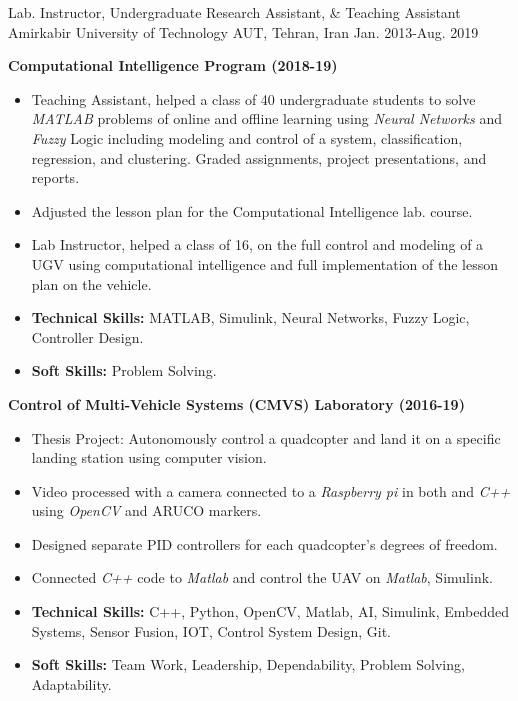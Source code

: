 \begin{cventries}
\cventry
{Lab. Instructor, Undergraduate Research Assistant, \& Teaching Assistant}
{Amirkabir University of Technology}
{AUT, Tehran, Iran}
{Jan. 2013-Aug. 2019}
{
    \begin{cvitems}
    \item{\textbf{Computational Intelligence Program (2018-19)}}
      \begin{itemize}[label= - ] %
        \item{Teaching Assistant, helped a class of 40 undergraduate students to solve \textit{MATLAB} problems of online and offline learning using \textit{Neural Networks} and \textit{Fuzzy} Logic including modeling and control of a system, classification, regression, and clustering. Graded assignments, project presentations, and reports.}
        \item{Adjusted the lesson plan for the Computational Intelligence lab. course.}
        \item{Lab Instructor, helped a class of 16, on the full control and modeling of a UGV using computational intelligence and full implementation of the lesson plan on the vehicle.}
        \item {\textbf{Technical Skills:} MATLAB, Simulink, Neural Networks, Fuzzy Logic, Controller Design.}
        \item {\textbf{Soft Skills:} Problem Solving.}
      \end{itemize}
      \item{\textbf{Control of Multi-Vehicle Systems (CMVS) Laboratory (2016-19)}}
      \begin{itemize}[label= - ] %
        \item{Thesis Project: Autonomously control a quadcopter and land it on a specific landing station using computer vision.}
          \item{Video processed with a camera connected to a \textit{Raspberry pi} in both  and \textit{C++ } using \textit{OpenCV} and ARUCO markers.}
          \item{Designed separate PID controllers for each quadcopter's degrees of freedom.}
          \item{Connected \textit{C++} code to \textit{Matlab} and control the UAV  on \textit{Matlab}, Simulink.}
        \item {\textbf{Technical Skills:} C++, Python, OpenCV, Matlab, AI, Simulink, Embedded Systems, Sensor Fusion, IOT, Control System Design, Git.}
        \item {\textbf{Soft Skills:} Team Work, Leadership, Dependability, Problem Solving, Adaptability.}

\end{itemize}
\end{cvitems}}
\end{cventries}
